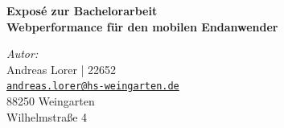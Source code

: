 \documentclass[a4paper,11pt,singlespacing]{article}
\author{Andreas Lorer}
\newcommand{\headline}{Exposé zur Bachelorarbeit}
\newcommand{\subheadline}{Webperformance für den mobilen Endanwender}
\begin{document}

		\begin{center}
			\thispagestyle{empty}
			\vspace{5.0cm}
	    {\large \bfseries \headline}\\[0.5cm]
	    \vspace{2.0cm}
	    {\huge \bfseries \subheadline}\\[1.5cm]
			\vspace{10.0cm}		
		\end{center}


	  \begin{flushleft}\large
	  \hspace*{2cm} \emph{Autor:}\\
	  \hspace*{2cm} Andreas Lorer | 22652\\
	  \hspace*{2cm} \href{mailto:andreas.lorer@hs-weingarten.de}{\nolinkurl{andreas.lorer@hs-weingarten.de} }\\
	    \hspace*{2cm} 88250 Weingarten\\
	    \hspace*{2cm} Wilhelmstraße 4
	  \end{flushleft}
  	\pagebreak

	\tableofcontents 											
	\thispagestyle{empty}
	\pagebreak
\end{document}

